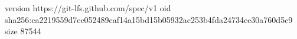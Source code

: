 version https://git-lfs.github.com/spec/v1
oid sha256:ca2219559d7ec052489caf14a15bd15b05932ac253b4fda24734ce30a760d5c9
size 87544

